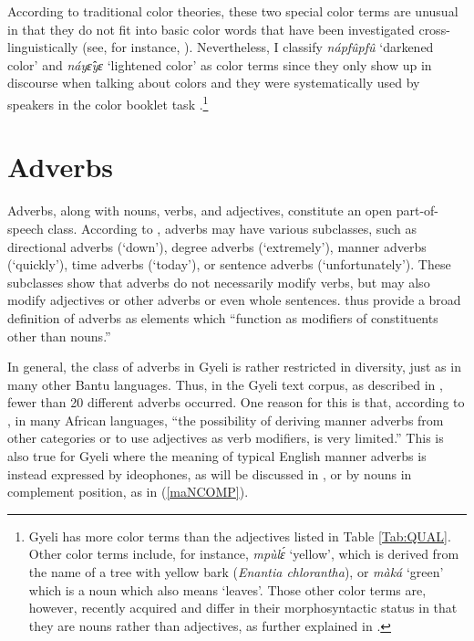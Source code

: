 According to traditional color theories, these two special color terms are unusual in that they do not fit into basic color words that have been investigated cross-linguistically (see, for instance, \citealt{berlin69}). 
Nevertheless, I classify {\itshape nápfûpfû} `darkened color' and {\itshape náyɛ̂yɛ} `lightened color' as color terms since they only show up in discourse when talking about colors and they were systematically used by speakers in the color booklet task \citep{majid2007a}.\footnote{Gyeli has more color terms than the adjectives listed in Table \ref{Tab:QUAL}. Other color terms include, for instance, {\itshape mpùlɛ́} `yellow', which is derived from the name of a tree with yellow bark ({\itshape Enantia chlorantha}), or {\itshape màká} `green' which is a noun which also means `leaves'. Those other color terms are, however, recently acquired and differ in their morphosyntactic status in that they are nouns rather than adjectives, as further explained in \citet{grimm2014}.}







\section{Adverbs}
\label{sec:ADV}







Adverbs, along with nouns, verbs, and adjectives, constitute an open part-of-speech class. According to \citet[20]{schachter2007}, adverbs may have various subclasses, such as directional adverbs (`down'), degree adverbs (`extremely'), manner adverbs (`quickly'), time adverbs (`today'), or sentence adverbs (`unfortunately'). These subclasses show that adverbs do not necessarily modify verbs, but may also modify adjectives or other adverbs or even whole sentences. \citet[20]{schachter2007} thus provide a broad definition of adverbs as elements which ``function as modifiers of constituents other than nouns.'' 

In general, the class of adverbs in Gyeli is rather restricted in diversity, just as in many other Bantu languages. Thus, in the Gyeli text corpus, as described in ,
 fewer than 20 different adverbs occurred. One reason for this is that, according to  \citet[126]{creissels2008}, in many African languages, ``the possibility of deriving manner adverbs from other categories or to use adjectives as verb modifiers, is very limited.''  This is also true for Gyeli where the meaning of typical English manner adverbs is instead expressed by ideophones, as will be discussed in , or by nouns in complement position, as in (\ref{maNCOMP}).


